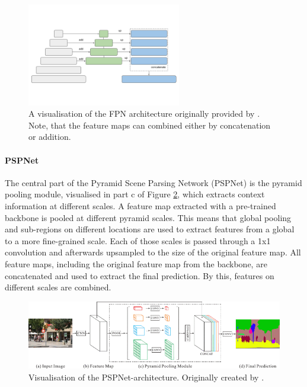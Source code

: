 \begin{figure}[htb!]
	\centering
	\includegraphics[width=0.6\textwidth]{fig/fpn-architecture.png}
	\caption{A visualisation of the FPN architecture originally provided by \citeauthor{SegmentationModels} \cite{SegmentationModels}. Note, that the feature maps can combined either by concatenation or addition.}
	\label{fig:fpn-architecture}
\end{figure}


\paragraph{PSPNet}

The central part of the Pyramid Scene Parsing Network (PSPNet) is the pyramid pooling module, visualised in part c of Figure \ref{fig:pspnet-architecture}, which extracts context information at different scales. A feature map extracted with a pre-trained backbone is pooled at different pyramid scales. This means that global pooling and sub-regions on different locations are used to extract features from a global to a more fine-grained scale. Each of those scales is passed through a 1x1 convolution and afterwards upsampled to the size of the original feature map. All feature maps, including the original feature map from the backbone, are concatenated and used to extract the final prediction. By this, features on different scales are combined. \cite{Zhao2017, ArcGIS}

\begin{figure}[htb!]
	\centering
	\includegraphics[width=\textwidth]{fig/pspnet-architecture.png}
	\caption{Visualisation of the PSPNet-architecture. Originally created by \citeauthor{Zhao2017} \cite{Zhao2017}.}
	\label{fig:pspnet-architecture}
\end{figure}

